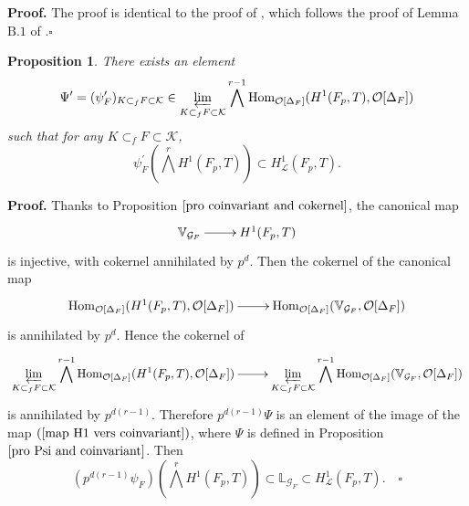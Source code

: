 \documentclass[reqno]{amsart}
\newcounter{dummy} \numberwithin{dummy}{section}
\newtheorem{pro}[dummy]{Proposition}
\begin{document}
\noindent \textbf{Proof.} The proof is identical to the proof of
\cite[Proposition 3.17]{Kazim109}, which follows the proof of Lemma
$\mathrm{B}.1$ of  \cite{MR04}.\hfill $\square$
\begin{pro}\label{pro element psi0}
There exists an element
$$\Psi^{\prime}=(\psi^{\prime}_{F})_{K\subset_{f}F\subset \mathcal{K}}\in
\varprojlim_{K\subset_{f}F\subset
\mathcal{K}}\bigwedge^{r-1}\mathrm{Hom}_{\mathcal{O}[\Delta_{F}]}(H^{1}(F_{p},T),\mathcal{O}[\Delta_{F}])$$
such that for any $K\subset_{f}F\subset \mathcal{K}$,
$$
\psi^{\prime}_{F}(\bigwedge^{r}H^{1}(F_{p},T))\subset
H^{1}_{\mathcal{L}}(F_{p},T).
$$
\end{pro}
\noindent \textbf{Proof.} Thanks to Proposition $\ref{pro
coinvariant and cokernel}$, the canonical map
$$
\xymatrix@=2pc{ \mathbb{V}_{\mathcal{G}_{F}}\ar[r]& H^{1}(F_{p},T)}
$$
is injective, with cokernel annihilated by $p^{d}$. Then the
cokernel of the canonical map
$$
\xymatrix@=2pc{
\mathrm{Hom}_{\mathcal{O}[\Delta_{F}]}(H^{1}(F_{p},T),\mathcal{O}[\Delta_{F}])\ar[r]&
\mathrm{Hom}_{\mathcal{O}[\Delta_{F}]}(\mathbb{V}_{\mathcal{G}_{F}},\mathcal{O}[\Delta_{F}])}
$$
is annihilated by $p^{d}$. Hence the cokernel of
\begin{equation}\label{map H1 vers coinvariant}
\xymatrix@=2pc{ \displaystyle{\varprojlim_{K\subset_{f}F\subset
\mathcal{K}}}\bigwedge^{r-1}\mathrm{Hom}_{\mathcal{O}[\Delta_{F}]}(H^{1}(F_{p},T),\mathcal{O}[\Delta_{F}])\ar[r]&
\displaystyle{\varprojlim_{K\subset_{f}F\subset
\mathcal{K}}}\bigwedge^{r-1}
\mathrm{Hom}_{\mathcal{O}[\Delta_{F}]}(\mathbb{V}_{\mathcal{G}_{F}},\mathcal{O}[\Delta_{F}])}
\end{equation}
is annihilated by $p^{d(r-1)}$. Therefore $p^{d(r-1)}\Psi$ is an
element of the image of the map $(\ref{map H1 vers coinvariant})$,
where $\Psi$ is defined in Proposition $\ref{pro Psi and
coinvariant}$. Then
$$
(p^{d(r-1)}\psi_{F})(\bigwedge^{r}H^{1}(F_{p},T))\subset
\mathbb{L}_{\mathcal{G}_{F}}\subset
H^{1}_{\mathcal{L}}(F_{p},T).\quad \square
$$
\vskip 7pt
\end{document}
